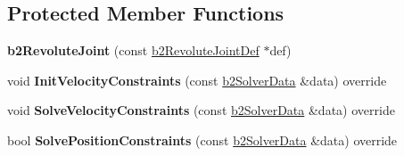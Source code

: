 \subsection*{Protected Member Functions}
\begin{DoxyCompactItemize}
\item 
\mbox{\label{classb2_revolute_joint_a2571c1438e909fb3518de6f88bb29e01}} 
{\bfseries b2\+Revolute\+Joint} (const \hyperlink{structb2_revolute_joint_def}{b2\+Revolute\+Joint\+Def} $\ast$def)
\item 
\mbox{\label{classb2_revolute_joint_a5ddddb865cc297c66721ae443bfb40a4}} 
void {\bfseries Init\+Velocity\+Constraints} (const \hyperlink{structb2_solver_data}{b2\+Solver\+Data} \&data) override
\item 
\mbox{\label{classb2_revolute_joint_a8eee8e87c79588ff041f1382b7fcbcd4}} 
void {\bfseries Solve\+Velocity\+Constraints} (const \hyperlink{structb2_solver_data}{b2\+Solver\+Data} \&data) override
\item 
\mbox{\label{classb2_revolute_joint_a01cab9d9609926a6debcd457bb8068f2}} 
bool {\bfseries Solve\+Position\+Constraints} (const \hyperlink{structb2_solver_data}{b2\+Solver\+Data} \&data) override
\end{DoxyCompactItemize}
